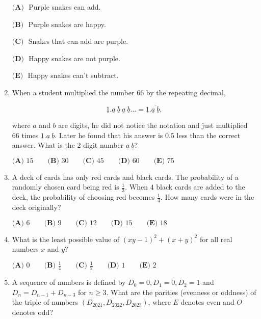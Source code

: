 \documentclass{article}
\begin{document}
\begin{enumerate}[label=\arabic*., itemsep=0.5em]
$\textbf{(A) }$ Purple snakes can add.

$\textbf{(B) }$ Purple snakes are happy.

$\textbf{(C) }$ Snakes that can add are purple.

$\textbf{(D) }$ Happy snakes are not purple.

$\textbf{(E) }$ Happy snakes can't subtract.\par \vspace{0.5em}\item When a student multiplied the number $66$ by the repeating decimal, 

\begin{equation*}
\underline{1}.\underline{a} \ \underline{b} \ \underline{a} \ \underline{b}\ldots=\underline{1}.\overline{\underline{a} \ \underline{b}},
\end{equation*}
 
where $a$ and $b$ are digits, he did not notice the notation and just multiplied $66$ times $\underline{1}.\underline{a} \ \underline{b}.$ Later he found that his answer is $0.5$ less than the correct answer. What is the $2$-digit number $\underline{a} \ \underline{b}?$

$\textbf{(A) }15 \qquad \textbf{(B) }30 \qquad \textbf{(C) }45 \qquad \textbf{(D) }60 \qquad \textbf{(E) }75$\par \vspace{0.5em}\item A deck of cards has only red cards and black cards. The probability of a randomly chosen card being red is $\frac13$. When $4$ black cards are added to the deck, the probability of choosing red becomes $\frac14$. How many cards were in the deck originally?

$\textbf{(A) }6 \qquad \textbf{(B) }9 \qquad \textbf{(C) }12 \qquad \textbf{(D) }15 \qquad \textbf{(E) }18$\par \vspace{0.5em}\item What is the least possible value of $(xy-1)^2+(x+y)^2$ for all real numbers $x$ and $y?$

$\textbf{(A) }0 \qquad \textbf{(B) }\frac14 \qquad \textbf{(C) }\frac12 \qquad \textbf{(D) }1 \qquad \textbf{(E) }2$\par \vspace{0.5em}\item A sequence of numbers is defined by $D_0=0,D_1=0,D_2=1$ and $D_n=D_{n-1}+D_{n-3}$ for $n\ge 3$. What are the parities (evenness or oddness) of the triple of numbers $(D_{2021},D_{2022},D_{2023})$, where $E$ denotes even and $O$ denotes odd?


\end{enumerate}
\end{document}
